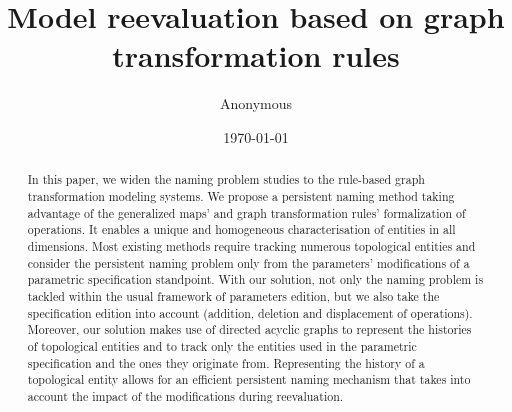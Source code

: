 \documentclass[twocolumn,a4paper]{article}
\title{Model reevaluation based on graph transformation rules}
\author{Anonymous}
\date{\today}
\begin{document}
\maketitle


\begin{abstract}
In this paper, we widen the naming problem studies to the rule-based graph transformation modeling systems. 
We propose a persistent naming method taking advantage of the generalized maps' and graph transformation rules’ formalization of operations.
It enables a unique and homogeneous characterisation of entities in all dimensions.
Most existing methods require tracking numerous topological entities and consider the persistent naming problem only from the parameters' modifications of a parametric specification standpoint. 
With 
our solution, not only the naming problem is tackled within the usual framework of parameters edition, but we also take the specification edition into account %
(addition, deletion and displacement of operations).
Moreover, our solution makes use of directed acyclic graphs %
to represent the histories of 
topological entities%
and to track only the entities used in the parametric specification and the ones they originate from. 
Representing 
the
history of a topological entity 
allows for an efficient persistent naming mechanism that takes into account the impact
of the modifications during reevaluation.


\end{abstract}
\end{document}
